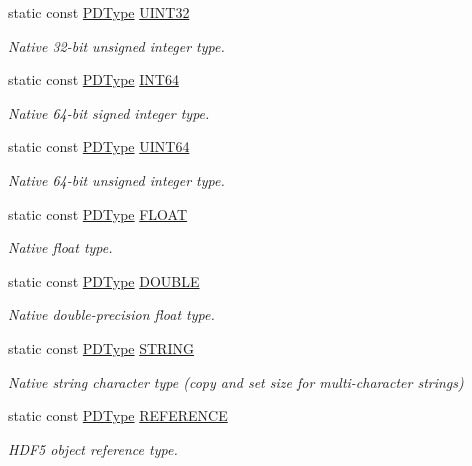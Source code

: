 \begin{DoxyCompactItemize}
static const \hyperlink{class_h5_t_l_1_1_p_d_type}{P\-D\-Type} \hyperlink{class_h5_t_l_1_1_d_type_a29c3994fbc6782ddfb316178fa17864d}{U\-I\-N\-T32}
\begin{DoxyCompactList}\small\item\em Native 32-\/bit unsigned integer type. \end{DoxyCompactList}\item 
static const \hyperlink{class_h5_t_l_1_1_p_d_type}{P\-D\-Type} \hyperlink{class_h5_t_l_1_1_d_type_ae8b348ef9c7faa11383fc84389ff8ffc}{I\-N\-T64}
\begin{DoxyCompactList}\small\item\em Native 64-\/bit signed integer type. \end{DoxyCompactList}\item 
static const \hyperlink{class_h5_t_l_1_1_p_d_type}{P\-D\-Type} \hyperlink{class_h5_t_l_1_1_d_type_abc95d3cc92fc398366a0a52bd21ded7a}{U\-I\-N\-T64}
\begin{DoxyCompactList}\small\item\em Native 64-\/bit unsigned integer type. \end{DoxyCompactList}\item 
static const \hyperlink{class_h5_t_l_1_1_p_d_type}{P\-D\-Type} \hyperlink{class_h5_t_l_1_1_d_type_aa7b15a197d2cc12261708d234eafecf5}{F\-L\-O\-A\-T}
\begin{DoxyCompactList}\small\item\em Native float type. \end{DoxyCompactList}\item 
static const \hyperlink{class_h5_t_l_1_1_p_d_type}{P\-D\-Type} \hyperlink{class_h5_t_l_1_1_d_type_ad17216b2872b91a3ab1ae498fec46773}{D\-O\-U\-B\-L\-E}
\begin{DoxyCompactList}\small\item\em Native double-\/precision float type. \end{DoxyCompactList}\item 
static const \hyperlink{class_h5_t_l_1_1_p_d_type}{P\-D\-Type} \hyperlink{class_h5_t_l_1_1_d_type_a261bdb031bcbd6930d09e11c53eb45d3}{S\-T\-R\-I\-N\-G}
\begin{DoxyCompactList}\small\item\em Native string character type (copy and set size for multi-\/character strings) \end{DoxyCompactList}\item 
static const \hyperlink{class_h5_t_l_1_1_p_d_type}{P\-D\-Type} \hyperlink{class_h5_t_l_1_1_d_type_aeec0653c7baf8f9c695d35ac3d5b5457}{R\-E\-F\-E\-R\-E\-N\-C\-E}
\begin{DoxyCompactList}\small\item\em H\-D\-F5 object reference type. \end{DoxyCompactList}\end{DoxyCompactItemize}
